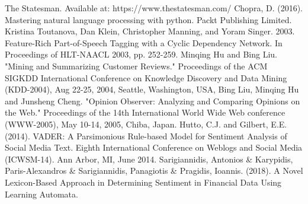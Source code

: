 \documentclass[conference]{IEEEtran}
\begin{document}
\begin{thebibliography}{100}
	The Statesman. Available at: https://www.thestatesman.com/
	 Chopra, D. (2016). Mastering natural language processing with python. Packt Publishing Limited.
	 Kristina Toutanova, Dan Klein, Christopher Manning, and Yoram Singer. 2003. Feature-Rich Part-of-Speech Tagging with a Cyclic Dependency Network. In Proceedings of HLT-NAACL 2003, pp. 252-259.
	Minqing Hu and Bing Liu. "Mining and Summarizing Customer Reviews." 
	Proceedings of the ACM SIGKDD International Conference on Knowledge Discovery and Data Mining (KDD-2004), Aug 22-25, 2004, Seattle,     Washington, USA, 
	Bing Liu, Minqing Hu and Junsheng Cheng. "Opinion Observer: Analyzing 
	and Comparing Opinions on the Web." Proceedings of the 14th 
	International World Wide Web conference (WWW-2005), May 10-14,  2005, Chiba, Japan.
	Hutto, C.J. and Gilbert, E.E. (2014). VADER: A Parsimonious Rule-based Model for Sentiment Analysis of Social Media Text. Eighth International Conference on
	Weblogs and Social Media (ICWSM-14). Ann Arbor, MI, June 2014.
	Sarigiannidis, Antonios \& Karypidis, Paris-Alexandros \& Sarigiannidis, Panagiotis \& Pragidis, Ioannis. (2018). A Novel Lexicon-Based Approach in Determining Sentiment in Financial Data Using Learning Automata.
	
\end{thebibliography}
\end{document}
